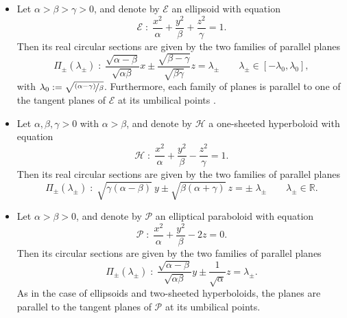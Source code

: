 \documentclass[10pt, a4paper]{article}
\theoremstyle{BoldTopSpacing}
\theoremstyle{BoldTopSpacing}
\theoremstyle{BoldTopSpacing}
\theoremstyle{BoldTopBottomSpacing}
\theoremstyle{BoldTopSpacing}
\theoremstyle{BoldTopBottomSpacing}
\theoremstyle{remark}
\begin{document}
\begin{itemize}[label=$\blacktriangleright$]
    \item Let $\alpha > \beta > \gamma > 0$, and denote by $\mathcal{E}$ an ellipsoid with equation
        \[
            \mathcal{E} \; : \; \frac{x^2}{\alpha} + \frac{y^2}{\beta} + \frac{z^2}{\gamma} = 1.
        \]
        Then its real circular sections are given by the two families of parallel planes
        \begin{equation}
        \label{eq:planes-ellipsoids}
            \Pi_{\pm}(\lambda_{\pm}) \; : \; \frac{\sqrt{\alpha - \beta}}{\sqrt{\alpha \beta}} x \pm \frac{\sqrt{\beta - \gamma}}{\sqrt{ \beta \gamma}} z = \lambda_{\pm} \quad \quad \lambda_{\pm} \in \left[ -\lambda_{0}, \lambda_{0} \right],
        \end{equation}
        with $\lambda_{0} := \sqrt{\nicefrac{\left(\alpha - \gamma\right)}{\beta}}$. Furthermore, each family of planes is parallel to one of the tangent planes of $\mathcal{E}$ at its umbilical points  \cite{geometryIII}.
    \item Let $\alpha, \beta, \gamma > 0$ with $\alpha > \beta$, and denote by $\mathcal{H}$ a one-sheeted hyperboloid with equation
        \[
            \mathcal{H} \; : \; \frac{x^2}{\alpha} + \frac{y^2}{\beta} - \frac{z^2}{\gamma} = 1.
        \]
        Then its real circular sections are given by the two families of parallel planes
        \begin{equation}
        \label{eq:planes-one-sheeted}
            \Pi_{\pm}(\lambda_{\pm}) \; : \;  \sqrt{ \gamma (\alpha- \beta) } \ y \pm \sqrt{\beta(\alpha+\gamma)} \ z = \pm \; \lambda_{\pm} \quad \quad \lambda_{\pm} \in \mathbb{R}.
        \end{equation}
    \item Let $\alpha > \beta > 0$, and denote by $\mathcal{P}$ an elliptical paraboloid with equation
        \[
            \mathcal{P} \; : \; \frac{x^2}{\alpha} + \frac{y^2}{\beta} - 2 z = 0.
        \]
        Then its circular sections are given by the two families of parallel planes
        \begin{equation}
        \label{eq:planes-paraboloids}
            \Pi_{\pm}(\lambda_{\pm}) \; : \; \frac{\sqrt{\alpha - \beta}}{\sqrt{\alpha \beta}} y \pm \frac{1}{\sqrt{\alpha}} z = \lambda_{\pm}.
        \end{equation}
        As in the case of ellipsoids and two-sheeted hyperboloids, the planes are parallel to the tangent planes of $\mathcal{P}$ at its umbilical points.
\end{itemize}
\end{document}
